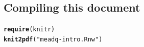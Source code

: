 \documentclass{article}\usepackage[]{graphicx}\usepackage[]{color}
\makeatletter
\newcommand{\hlstr}[1]{\textcolor[rgb]{0.192,0.494,0.8}{#1}}%
\newcommand{\hlstd}[1]{\textcolor[rgb]{0.345,0.345,0.345}{#1}}%
\newcommand{\hlkwd}[1]{\textcolor[rgb]{0.737,0.353,0.396}{\textbf{#1}}}%
\newenvironment{kframe}{%
 \def\at@end@of@kframe{}%
 \ifinner\ifhmode%
  \def\at@end@of@kframe{\end{minipage}}%
  \begin{minipage}{\columnwidth}%
 \fi\fi%
 \def\FrameCommand##1{\hskip\@totalleftmargin \hskip-\fboxsep
 \colorbox{shadecolor}{##1}\hskip-\fboxsep
     \hskip-\linewidth \hskip-\@totalleftmargin \hskip\columnwidth}%
 \MakeFramed {\advance\hsize-\width
   \@totalleftmargin\z@ \linewidth\hsize
   \@setminipage}}%
 {\par\unskip\endMakeFramed%
 \at@end@of@kframe}
\newenvironment{knitrout}{}{} %
\makeatother
\begin{document}



\subsection*{Compiling this document}

\begin{knitrout}
\color{fgcolor}\begin{kframe}
\begin{alltt}
\hlkwd{require}\hlstd{(knitr)}
\hlkwd{knit2pdf}\hlstd{(}\hlstr{"meadq-intro.Rnw"}\hlstd{)}
\end{alltt}
\end{kframe}
\end{knitrout}
\end{document}
